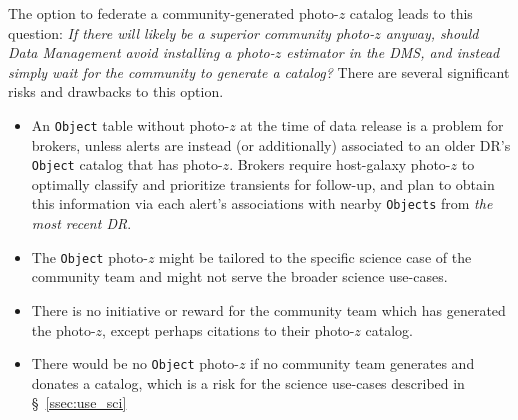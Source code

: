\documentclass[DM,lsstdraft,toc]{lsstdoc}
\begin{document}
The option to federate a community-generated photo-$z$ catalog leads to this question: {\it If there will likely be a superior community photo-$z$ anyway, should Data Management avoid installing a photo-$z$ estimator in the DMS, and instead simply wait for the community to generate a catalog?}
There are several significant risks and drawbacks to this option.
\vspace{-15pt}
\begin{itemize}
\item An {\tt Object} table without photo-$z$ at the time of data release is a problem for brokers, unless alerts are instead (or additionally) associated to an older DR's {\tt Object} catalog that has photo-$z$. Brokers require host-galaxy photo-$z$ to optimally classify and prioritize transients for follow-up, and plan to obtain this information via each alert's associations with nearby {\tt Objects} from {\it the most recent DR}.
\item The {\tt Object} photo-$z$ might be tailored to the specific science case of the community team and might not serve the broader science use-cases.
\item There is no initiative or reward for the community team which has generated the photo-$z$, except perhaps citations to their photo-$z$ catalog.
\item There would be no {\tt Object} photo-$z$ if no community team generates and donates a catalog, which is a risk for the science use-cases described in \S~\ref{ssec:use_sci}
\end{itemize}
\end{document}
